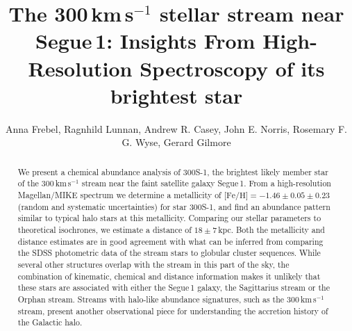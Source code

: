 \documentclass{emulateapj}
\begin{document}
\title{The 300\,km\,s$^{-1}$ stellar stream near Segue\,1: Insights From
  High-Resolution Spectroscopy of its brightest star}

\author{
Anna Frebel,
Ragnhild Lunnan,
Andrew R. Casey,
John E. Norris,
Rosemary F. G. Wyse,
Gerard Gilmore}









\begin{abstract}
We present a chemical abundance analysis of 300S-1, the brightest
likely member star of the 300\,km\,s$^{-1}$ stream near the faint
satellite galaxy Segue\,1. From a high-resolution Magellan/MIKE
spectrum we determine a metallicity of $\mbox{[Fe/H]} = -1.46 \pm 0.05
\pm 0.23$ (random and systematic uncertainties) for star 300S-1, and
find an abundance pattern similar to typical halo stars at this
metallicity. Comparing our stellar parameters to theoretical
isochrones, we estimate a distance of $18 \pm 7$\,kpc. Both the
metallicity and distance estimates are in good agreement with what can
be inferred from comparing the SDSS photometric data of the stream
stars to globular cluster sequences. While several other structures
overlap with the stream in this part of the sky, the combination of
kinematic, chemical and distance information makes it unlikely that
these stars are associated with either the Segue\,1 galaxy, the
Sagittarius stream or the Orphan stream. Streams with halo-like
abundance signatures, such as the 300\,km\,s$^{-1}$ stream, present
another observational piece for understanding the accretion history of
the Galactic halo.

\end{abstract}
\end{document}
